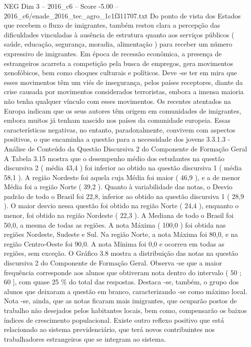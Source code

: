 \begin{textsample}{NEG Dim 3 – 2016\_c6 – Score -5.00 – 2016\_c6/enade\_2016\_tec\_agro\_1c1f311707.txt}
Do ponto de vista dos Estados que recebem o fluxo de imigrantes, também restou clara a percepção das dificuldades vinculadas à ausência de estrutura quanto aos serviços públicos ( saúde, educação, segurança, moradia, alimentação ) para receber um número expressivo de imigrantes.
Em época de recessão econômica, a presença de estrangeiros acarreta a competição pela busca de empregos, gera movimentos xenofóbicos, bem como choques culturais e políticos.
Deve -se ter em mira que esses movimentos têm um viés de insegurança, pelos países receptores, diante da crise causada por movimentos considerados terroristas, embora a imensa maioria não tenha qualquer vínculo com esses movimentos.
Os recentes atentados na Europa indicam que os seus autores têm origem em comunidades de imigrantes, embora muitos já tenham nascido nos países da comunidade europeia.
Essas características negativas, no entanto, paradoxalmente, convivem com aspectos positivos, o que encaminha a questão para a necessidade dos jovens 3.3.1.3 - Análise de Conteúdo da Questão Discursiva 2 do Componente de Formação Geral A Tabela 3.15 mostra que o desempenho médio dos estudantes na questão discursiva 2 ( média 43,4 ) foi inferior ao obtido na questão discursiva 1 ( média 58,1 ).
A região Nordeste foi aquela cuja Média foi maior ( 46,9 ), e a de menor Média foi a região Norte ( 39,2 ).
Quanto à variabilidade das notas, o Desvio padrão de todo o Brasil foi 22,8, inferior ao obtido na questão discursiva 1 ( 28,9 ).
O maior desvio nessa questão foi obtido na região Norte ( 24,4 ), enquanto o menor, foi obtido na região Nordeste ( 22,3 ).
A Mediana de todo o Brasil foi 50,0, a mesma de todas as regiões.
A nota Máxima ( 100,0 ) foi obtida nas regiões Nordeste, Sudeste e Sul.
Na região Norte, a nota Máxima foi 80,0, e na região Centro-Oeste foi 90,0.
A nota Mínima foi 0,0 e ocorreu em todas as regiões, sem exceção.
O Gráfico 3.8 mostra a distribuição das notas na questão discursiva 2 do Componente de Formação Geral.
Observa -se que a maior frequência corresponde aos alunos que obtiveram nota dentro do intervalo ( 50 ; 60 ], com quase 25 \% do total das respostas.
Destaca -se, também, o grupo dos alunos que deixaram a questão em branco, caracterizando -se como máximo local.
Nota -se, ainda, que as notas ficaram mais imigrantes, que ocuparão postos de trabalho não desejados pelos habitantes locais, bem como, compensarão os baixos índices de crescimento populacional.
Existe outro reflexo positivo que está relacionado ao sistema previdenciário, que terá novos contribuintes nos trabalhadores estrangeiros que se integram ao sistema.

\end{textsample}
